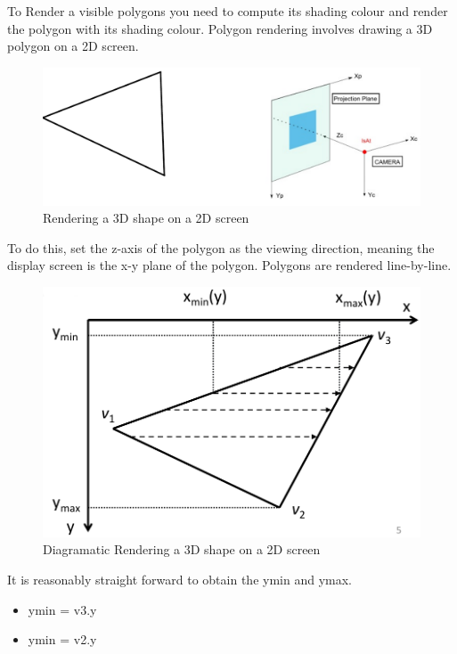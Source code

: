 \documentclass[
]{book}
\providecommand{\tightlist}{%
  \setlength{\itemsep}{0pt}\setlength{\parskip}{0pt}}
\begin{document}
To Render a {visible polygons} you need to compute its {shading colour} and {render} the polygon with its shading colour. Polygon rendering involves drawing a 3D polygon on a 2D screen.

\begin{figure}
\centering
\includegraphics{img/08-image31.png}
\caption{\label{fig:polygon-render}Rendering a 3D shape on a 2D screen}
\end{figure}

To do this, set the z-axis of the polygon as the viewing direction, meaning the display screen is the x-y plane of the polygon. Polygons are rendered {line-by-line}.

\begin{figure}
\centering
\includegraphics{img/08-image32.png}
\caption{\label{fig:polygon-render2}Diagramatic Rendering a 3D shape on a 2D screen}
\end{figure}

It is reasonably straight forward to obtain the ymin and ymax.

\begin{itemize}
\tightlist
\item
  ymin = v3.y
\item
  ymin = v2.y
\end{itemize}
\end{document}
